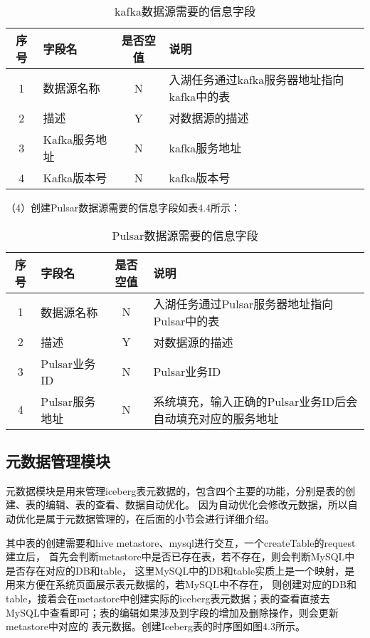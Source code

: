 \begin{table}[h]
  \centering
  \caption{kafka数据源需要的信息字段}
  \label{tab:exampletable}
  \begin{tabular}{clcl}
    \toprule
    序号  & 字段名     & 是否空值   & 说明                                      \\
    \midrule
    1    & 数据源名称  & N        & 入湖任务通过kafka服务器地址指向kafka中的表 \\
    2    & 描述       & Y        & 对数据源的描述                               \\
    3    & Kafka服务地址    & N        & kafka服务地址                           \\
    4    & Kafka版本号      & N        &  kafka版本号       \\
    \bottomrule
  \end{tabular}
\end{table}

（4）创建Pulsar数据源需要的信息字段如表4.4所示：

\begin{table}[h]
  \centering
  \caption{Pulsar数据源需要的信息字段}
  \label{tab:exampletable}
  \begin{tabular}{clcl}
    \toprule
    序号  & 字段名     & 是否空值   & 说明                                      \\
    \midrule
    1    & 数据源名称  & N        & 入湖任务通过Pulsar服务器地址指向Pulsar中的表 \\
    2    & 描述       & Y        & 对数据源的描述                               \\
    3    & Pulsar业务ID    & N        & Pulsar业务ID                          \\
    4    & Pulsar服务地址      & N        &  系统填充，输入正确的Pulsar业务ID后会自动填充对应的服务地址      \\
    \bottomrule
  \end{tabular}
\end{table}

\subsection{元数据管理模块}

元数据模块是用来管理iceberg表元数据的，包含四个主要的功能，分别是表的创建、表的编辑、表的查看、数据自动优化。
因为自动优化会修改元数据，所以自动优化是属于元数据管理的，在后面的小节会进行详细介绍。

其中表的创建需要和hive metastore、mysql进行交互，一个createTable的request建立后，
首先会判断metastore中是否已存在表，若不存在，则会判断MySQL中是否存在对应的DB和table，
这里MySQL中的DB和table实质上是一个映射，是用来方便在系统页面展示表元数据的，若MySQL中不存在，
则创建对应的DB和table，接着会在metastore中创建实际的iceberg表元数据；表的查看直接去
MySQL中查看即可；表的编辑如果涉及到字段的增加及删除操作，则会更新metastore中对应的
表元数据。创建Iceberg表的时序图如图4.3所示。

